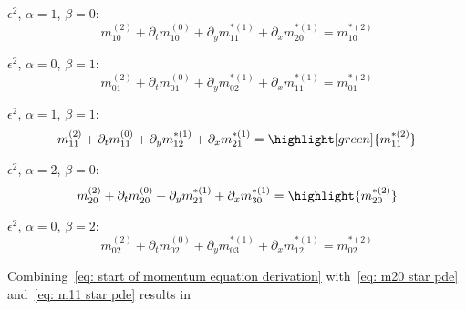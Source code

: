 $\epsilon^2$, $\alpha=1$, $\beta=0$:
\begin{equation}
  \label{eq: m10 star pde}
  m_{10}^{(2)} + \partial_t m_{10}^{(0)} + \partial_y m_{11}^{*(1)} + \partial_x m_{20}^{*(1)} = m_{10}^{*(2)}
\end{equation}

$\epsilon^2$, $\alpha=0$, $\beta=1$:
\begin{equation}
  \label{eq: m01 star pde}
  m_{01}^{(2)} + \partial_t m_{01}^{(0)} + \partial_y m_{02}^{*(1)} + \partial_x m_{11}^{*(1)} = m_{01}^{*(2)}
\end{equation}

$\epsilon^2$, $\alpha=1$, $\beta=1$:
\begin{equation}
  \label{eq: m11 star pde}
  m_{11}^{(2)} + \partial_t m_{11}^{(0)} + \partial_y m_{12}^{*(1)} + \partial_x m_{21}^{*(1)} = \highlight[green]{m_{11}^{*(2)}}
\end{equation}

$\epsilon^2$, $\alpha=2$, $\beta=0$:
\begin{equation}
  \label{eq: m20 star pde}
  m_{20}^{(2)} + \partial_t m_{20}^{(0)} + \partial_y m_{21}^{*(1)} + \partial_x m_{30}^{*(1)} = \highlight{m_{20}^{*(2)}}
\end{equation}

$\epsilon^2$, $\alpha=0$, $\beta=2$:
\begin{equation}
  \label{eq: m02 star pde}
  m_{02}^{(2)} + \partial_t m_{02}^{(0)} + \partial_y m_{03}^{*(1)} + \partial_x m_{12}^{*(1)} = m_{02}^{*(2)}
\end{equation}

Combining~\eqref{eq: start of momentum equation derivation} with~\eqref{eq: m20 star pde} and~\eqref{eq: m11 star pde} results in

